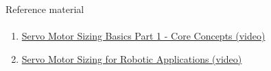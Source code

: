 \documentclass[aspectratio=169]{beamer}
\newcommand{\fbckg}[1]{\usebackgroundtemplate{\texttt{[image: \#1]}}}%
\begin{document}
\begin{frame}[t]{Reference material}
    \framesubtitle{}
    \begin{enumerate}
        \item \href{https://youtu.be/4MaGqSQfYOk}{Servo Motor Sizing Basics Part 1 - Core Concepts (video)}
        \item \href{https://youtu.be/VJFDU31LQGM}{Servo Motor Sizing for Robotic Applications (video)}
    \end{enumerate}
\end{frame}



\fbckg{fibeamer/figs/last_page.png}
\frame[plain]{}
\end{document}
